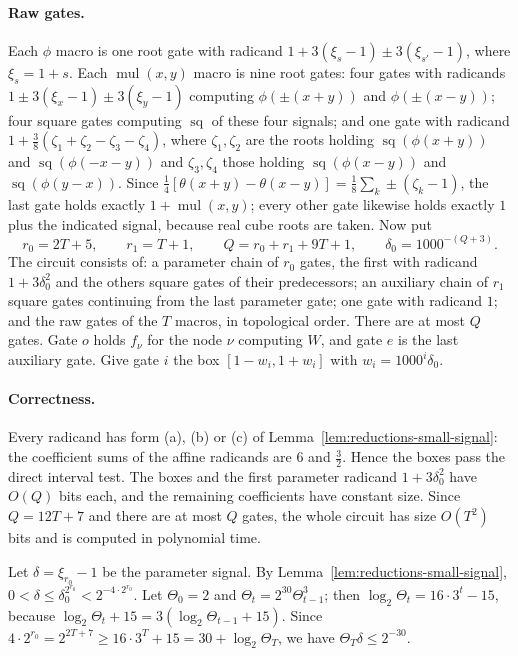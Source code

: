 \paragraph{Raw gates.}
Each $\phi$ macro is one root gate with radicand
$1+3(\xi_s-1)\pm3(\xi_{s'}-1)$, where $\xi_s=1+s$. Each $\operatorname{mul}(x,y)$
macro is nine root gates: four gates with radicands
$1\pm3(\xi_x-1)\pm3(\xi_y-1)$ computing $\phi(\pm(x+y))$ and $\phi(\pm(x-y))$;
four square gates computing $\operatorname{sq}$ of these four signals; and one
gate with radicand $1+\frac38(\zeta_1+\zeta_2-\zeta_3-\zeta_4)$, where
$\zeta_1,\zeta_2$ are the roots holding $\operatorname{sq}(\phi(x+y))$ and
$\operatorname{sq}(\phi(-x-y))$ and $\zeta_3,\zeta_4$ those holding
$\operatorname{sq}(\phi(x-y))$ and $\operatorname{sq}(\phi(y-x))$. Since
$\frac14[\theta(x+y)-\theta(x-y)]=\frac18\sum_k\pm(\zeta_k-1)$, the last gate holds
exactly $1+\operatorname{mul}(x,y)$; every other gate likewise holds exactly
$1$ plus the indicated signal, because real cube roots are taken. Now put
\[
 r_0=2T+5,\qquad r_1=T+1,\qquad Q=r_0+r_1+9T+1,\qquad\delta_0=1000^{-(Q+3)}.
\]
The circuit consists of: a parameter chain of $r_0$ gates, the first with
radicand $1+3\delta_0^2$ and the others square gates of their predecessors;
an auxiliary chain of $r_1$ square gates continuing from the last parameter
gate; one gate with radicand $1$; and the raw gates of the $T$ macros, in
topological order. There are at most $Q$ gates. Gate $o$ holds $f_\nu$ for the
node $\nu$ computing $W$, and gate $e$ is the last auxiliary gate. Give gate
$i$ the box $[1-w_i,1+w_i]$ with $w_i=1000^i\delta_0$.

\paragraph{Correctness.}
Every radicand has form (a), (b) or (c) of
Lemma~\ref{lem:reductions-small-signal}: the coefficient sums of the affine
radicands are $6$ and $\frac32$. Hence the boxes pass the direct interval test.
The boxes and the first parameter radicand $1+3\delta_0^2$ have $O(Q)$ bits
each, and the remaining coefficients have constant size. Since $Q=12T+7$ and
there are at most $Q$ gates, the whole circuit has size $O(T^2)$ bits and is
computed in polynomial time.

Let $\delta=\xi_{r_0}-1$ be the parameter signal. By
Lemma~\ref{lem:reductions-small-signal},
$0<\delta\le\delta_0^{2^{r_0}}<2^{-4\cdot2^{r_0}}$. Let $\Theta_0=2$ and
$\Theta_t=2^{30}\Theta_{t-1}^3$; then $\log_2\Theta_t=16\cdot3^t-15$, because
$\log_2\Theta_t+15=3(\log_2\Theta_{t-1}+15)$. Since
$4\cdot2^{r_0}=2^{2T+7}\ge16\cdot3^T+15=30+\log_2\Theta_T$, we have
$\Theta_T\delta\le2^{-30}$.

